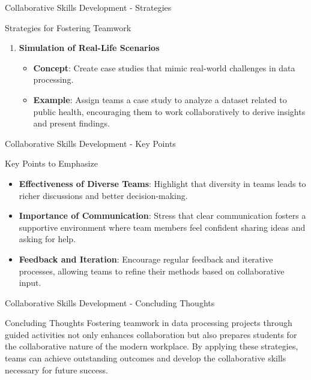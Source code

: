 \documentclass[aspectratio=169]{beamer}
\begin{document}
\begin{frame}[fragile]{Collaborative Skills Development - Strategies}
\begin{block}{Strategies for Fostering Teamwork}
\begin{enumerate}
\begin{itemize}
                \end{itemize}
            \item \textbf{Simulation of Real-Life Scenarios}
                \begin{itemize}
                    \item \textbf{Concept}: Create case studies that mimic real-world challenges in data processing.
                    \item \textbf{Example}: Assign teams a case study to analyze a dataset related to public health, encouraging them to work collaboratively to derive insights and present findings.
                \end{itemize}
        \end{enumerate}
    \end{block}
\end{frame}

\begin{frame}[fragile]{Collaborative Skills Development - Key Points}
    \begin{block}{Key Points to Emphasize}
        \begin{itemize}
            \item \textbf{Effectiveness of Diverse Teams}: Highlight that diversity in teams leads to richer discussions and better decision-making.
            \item \textbf{Importance of Communication}: Stress that clear communication fosters a supportive environment where team members feel confident sharing ideas and asking for help.
            \item \textbf{Feedback and Iteration}: Encourage regular feedback and iterative processes, allowing teams to refine their methods based on collaborative input.
        \end{itemize}
    \end{block}
\end{frame}

\begin{frame}[fragile]{Collaborative Skills Development - Concluding Thoughts}
    \begin{block}{Concluding Thoughts}
        Fostering teamwork in data processing projects through guided activities not only enhances collaboration but also prepares students for the collaborative nature of the modern workplace. 
        By applying these strategies, teams can achieve outstanding outcomes and develop the collaborative skills necessary for future success.
    \end{block}
\end{frame}
\end{document}
